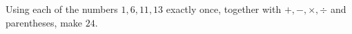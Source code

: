 Using each of the numbers $1,6,11,13$ exactly once, together with $+,-,\times,\div$ and parentheses, make $24$.

